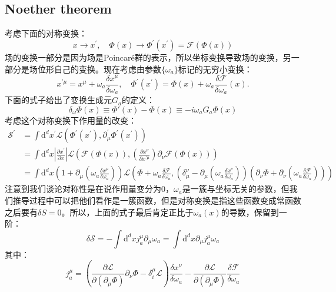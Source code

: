 \subsection{Noether theorem}
考虑下面的对称变换：
\[x\to x^{\prime},\quad\Phi(x)\to\Phi^{\prime}(x^{\prime})=\mathcal{F}(\Phi(x))\]
场的变换一部分是因为场是Poincar\'e群的表示，所以坐标变换导致场的变换，另一部分是场位形自己的变换。现在考虑由参数$\{\omega_a\}$标记的无穷小变换：
\[
x^{\prime\mu} =x^{\mu}+\omega_{a}\frac{\delta x^{\mu}}{\delta\omega_{a}},  \quad
\Phi^{\prime}(x^{\prime})=\Phi(x)+\omega_{a}\frac{\delta\mathcal{F}}{\delta\omega_{a}}(x).
\]
下面的式子给出了变换生成元$G_a$的定义：
\begin{equation}
	\delta_\omega\Phi(x)\equiv\Phi'(x)-\Phi(x)\equiv-i\omega_aG_a\Phi(x)
\end{equation}
考虑这个对称变换下作用量的改变：
\begin{equation}
	\begin{aligned}
		\mathcal{S}^\prime& =\int\mathrm{d}^{d}x^{\prime}{\mathcal L}(\Phi^{\prime}(x^{\prime}),\partial_{\mu}^{\prime}\Phi^{\prime}(x^{\prime}))  \\
		&=\int\mathrm{d}^{d}x\left|\frac{\partial x^{\prime}}{\partial x}\right|\mathcal{L}(\mathcal{F}(\Phi(x)),(\frac{\partial x^{\nu}}{\partial x^{\prime\mu}})\partial_{\nu}\mathcal{F}(\Phi(x)))\\
		&=\int\mathrm{d}^dx\left(1+\partial_\mu(\omega_a\frac{\delta x^\mu}{\delta\omega_a})\right)\mathcal{L}\left(\Phi+\omega_a\frac{\delta\mathcal{F}}{\delta\omega_a},\left(\delta_\mu^\nu-\partial_\mu(\omega_a\frac{\delta x^\nu}{\delta\omega_a})\right)\left(\partial_\nu\Phi+\partial_\nu(\omega_a\frac{\delta\mathcal{F}}{\delta\omega_a})\right)\right)
	\end{aligned}
\end{equation}
注意到我们谈论对称性是在说作用量变分为$0$，$\omega_a$是一簇与坐标无关的参数，但我们推导过程中可以把他们看作是一簇函数，但是对称变换是指这些函数变成常函数之后要有$\delta S=0$。所以，上面的式子最后肯定正比于$\omega_a(x)$的导数，保留到一阶：
\begin{equation}\label{eq:19.2}
	\delta\mathcal{S}=-\int\mathrm{d}^{d}xj_{a}^{\mu}\partial_{\mu}\omega_{a}=\int\mathrm{d}^{d}x\partial_{\mu}j_{a}^{\mu}\omega_{a}
\end{equation}
其中：
\begin{equation}\label{eq:19.3}
	\boxed{
		j_a^\mu=\left(\frac{\partial\mathcal{L}}{\partial(\partial_\mu\Phi)}\partial_\nu\Phi-\delta_i^\mu\mathcal{L}\right)\frac{\delta x^\nu}{\delta\omega_a}-\frac{\partial\mathcal{L}}{\partial(\partial_\mu\Phi)}\frac{\delta\mathcal{F}}{\delta\omega_a}
	}
\end{equation}

